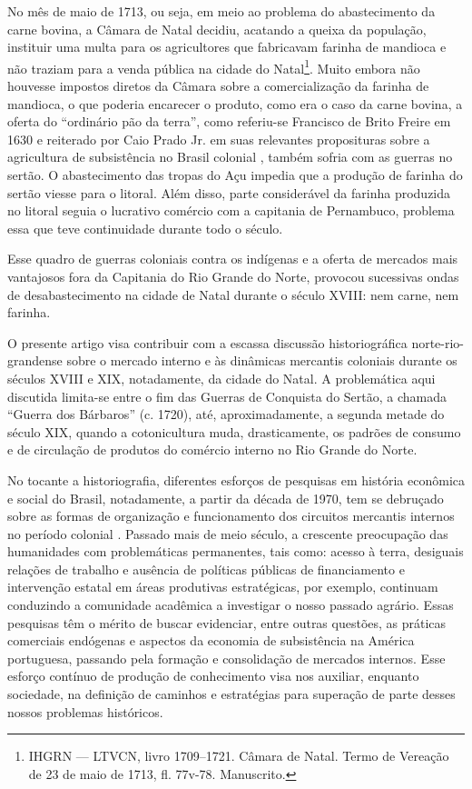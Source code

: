 \begin{refsection}
No mês de maio de 1713, ou seja, em meio ao problema do abastecimento da carne bovina, a Câmara de Natal decidiu, acatando a queixa da população, instituir uma multa para os agricultores que fabricavam farinha de mandioca e não traziam para a venda pública na cidade do Natal\footnote{IHGRN --- LTVCN, livro 1709--1721. Câmara de Natal. Termo de Vereação de 23 de maio de 1713, fl. 77v-78. Manuscrito.}. Muito embora não houvesse impostos diretos da Câmara sobre a comercialização da farinha de mandioca, o que poderia encarecer o produto, como era o caso da carne bovina, a oferta do ``ordinário pão da terra'', como referiu-se Francisco de Brito Freire em 1630 \cite[p.~187]{Freire1675nova} e reiterado por Caio Prado Jr. em suas relevantes proposituras sobre a agricultura de subsistência no Brasil colonial \cite[p.~165]{PradoJr1997}, também sofria com as guerras no sertão. O abastecimento das tropas do Açu impedia que a produção de farinha do sertão viesse para o litoral. Além disso, parte considerável da farinha produzida no litoral seguia o lucrativo comércio com a capitania de Pernambuco, problema essa que teve continuidade durante todo o século.

Esse quadro de guerras coloniais contra os indígenas e a oferta de mercados mais vantajosos fora da Capitania do Rio Grande do Norte, provocou sucessivas ondas de desabastecimento na cidade de Natal durante o século XVIII: nem carne, nem farinha.

O presente artigo visa contribuir com a escassa discussão historiográfica norte-rio-grandense sobre o mercado interno e às dinâmicas mercantis coloniais durante os séculos XVIII e XIX, notadamente, da cidade do Natal. A problemática aqui discutida limita-se entre o fim das Guerras de Conquista do Sertão, a chamada ``Guerra dos Bárbaros'' (c. 1720), até, aproximadamente, a segunda metade do século XIX, quando a cotonicultura muda, drasticamente, os padrões de consumo e de circulação de produtos do comércio interno no Rio Grande do Norte.  

No tocante a historiografia, diferentes esforços de pesquisas em história econômica e social do Brasil, notadamente, a partir da década de 1970, tem se debruçado sobre as formas de organização e funcionamento dos circuitos mercantis internos no período colonial \cites{Linhares1979historia}{Lapa1980modos}. Passado mais de meio século, a crescente preocupação das humanidades com problemáticas permanentes, tais como: acesso à terra, desiguais relações de trabalho e ausência de políticas públicas de financiamento e intervenção estatal em áreas produtivas estratégicas, por exemplo, continuam conduzindo a comunidade acadêmica a investigar o nosso passado agrário. Essas pesquisas têm o mérito de buscar evidenciar, entre outras questões, as práticas comerciais endógenas e aspectos da economia de subsistência na América portuguesa, passando pela formação e consolidação de mercados internos. Esse esforço contínuo de produção de conhecimento visa nos auxiliar, enquanto sociedade, na definição de caminhos e estratégias para superação de parte desses nossos problemas históricos. 


\end{refsection}
